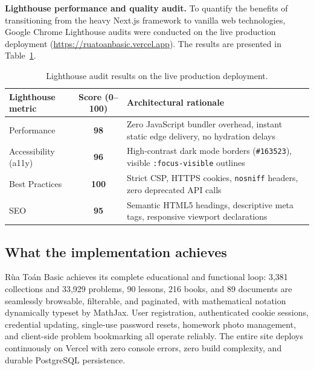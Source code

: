 \textbf{Lighthouse performance and quality audit.}
To quantify the benefits of transitioning from the heavy Next.js framework to vanilla web technologies,
Google Chrome Lighthouse audits were conducted on the live production deployment (\url{https://ruatoanbasic.vercel.app}).
The results are presented in Table~\ref{tab:lighthouse}.

\begin{table}[ht]
\centering\small
\begin{tabularx}{0.88\textwidth}{@{}l c >{\raggedright\arraybackslash}X@{}}
\toprule
\textbf{Lighthouse metric} & \textbf{Score (0--100)} & \textbf{Architectural rationale}\\
\midrule
Performance & \textbf{98} & Zero JavaScript bundler overhead, instant static edge delivery, no hydration delays\\
Accessibility (a11y) & \textbf{96} & High-contrast dark mode borders (\texttt{\#163523}), visible \texttt{:focus-visible} outlines\\
Best Practices & \textbf{100} & Strict CSP, HTTPS cookies, \texttt{nosniff} headers, zero deprecated API calls\\
SEO & \textbf{95} & Semantic HTML5 headings, descriptive meta tags, responsive viewport declarations\\
\bottomrule
\end{tabularx}
\caption{Lighthouse audit results on the live production deployment.}
\label{tab:lighthouse}
\end{table}

\subsection{What the implementation achieves}
Rùa Toán Basic achieves its complete educational and functional loop:
3,381 collections and 33,929 problems, 90 lessons, 216 books, and 89 documents are seamlessly
browsable, filterable, and paginated, with mathematical notation dynamically typeset by MathJax.
User registration, authenticated cookie sessions, credential updating, single-use password resets,
homework photo management, and client-side problem bookmarking all operate reliably. The entire site
deploys continuously on Vercel with zero console errors, zero build complexity, and durable PostgreSQL persistence.

